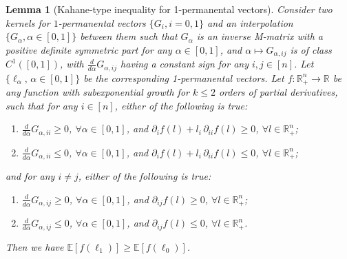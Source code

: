 \documentclass[a4paper, 11pt]{article}
\newcommand{\E}{\mathbb{E}}
\newtheorem{lem}[thm]{Lemma}
\begin{document}
\vspace{.3em} \begin{lem}[Kahane-type inequality for 1-permanental vectors]
\label{lem:kahane}
Consider two kernels for $1$-permanental vectors $\{G_i, i=0,1\}$ and an interpolation $\{G_\alpha, \alpha\in[0,1]\}$ between them such that $G_\alpha$ is an inverse M-matrix with a positive definite symmetric part for any $\alpha\in[0,1]$, and $\alpha\mapsto G_{\alpha,ij}$ is of class $C^1([0,1])$, with $\frac{d}{d\alpha}G_{\alpha, ij}$ having a constant sign for any $i,j\in[n]$. Let $\{\ell_\alpha,\, \alpha\in[0,1]\}$ be the corresponding 1-permanental vectors.
Let $f:\mathbb{R}_+^n\rightarrow \mathbb{R}$ be any function with subexponential growth for $k\leq 2$ orders of partial derivatives, such that for any $i\in[n]$, either of the following is true:
\begin{enumerate}
    \item $\frac{d}{d\alpha}G_{\alpha,ii}\geq 0$, $\forall \alpha\in[0,1]$, and $\partial_i f(l)+l_i\,\partial_{ii}f(l)\geq 0$, $\forall l\in\mathbb{R}_+^n$;
    \item $\frac{d}{d\alpha}G_{\alpha,ii}\leq 0$, $\forall \alpha\in[0,1]$, and $\partial_i f(l)+l_i\,\partial_{ii}f(l)\leq 0$, $\forall l\in\mathbb{R}_+^n$;
\end{enumerate}

and for any $i\neq j$, either of the following is true:
\begin{enumerate}
    \item $\frac{d}{d\alpha}G_{\alpha,ij}\geq 0$, $\forall \alpha\in[0,1]$, and $\partial_{ij}f(l)\geq 0$, $\forall l\in\mathbb{R}_+^n$;
    \item $\frac{d}{d\alpha}G_{\alpha,ij}\leq 0$, $\forall \alpha\in[0,1]$, and $\partial_{ij}f(l)\leq 0$, $\forall l\in\mathbb{R}_+^n$.
\end{enumerate}

Then we have $\E[f(\ell_1)]\geq \E[f(\ell_0)]$.
\end{lem}
\end{document}
